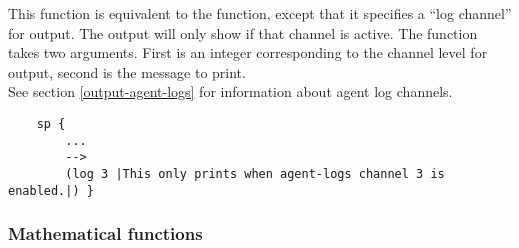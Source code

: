 \begin{description}




\item [\soarb{log} --- ]
	This function is equivalent to the  function, except that it specifies a ``log channel'' for output. The output will only show if that channel is active. The function takes two arguments. First is an integer corresponding to the channel level for output, second is the message to print. \\
	See section \ref{output-agent-logs} for information about agent log channels.

	\begin{verbatim}
	sp {
		...
		-->
		(log 3 |This only prints when agent-logs channel 3 is enabled.|) }
	\end{verbatim}

\end{description}

\subdivider
\subsubsection*{Mathematical functions}

